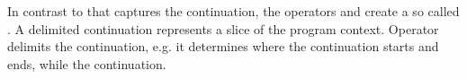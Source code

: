 In contrast to \cc that captures the  continuation, the
operators \shift and \reset create a so called . A
delimited continuation represents a slice of the program context. Operator
\reset delimits the continuation, e.g. it determines where the continuation
starts and ends, while \shift {} the continuation.
